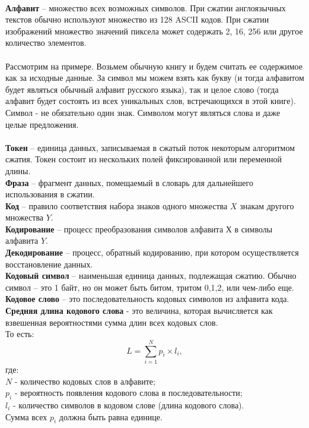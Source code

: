 \\\textbf{Алфавит} -- множество всех возможных символов. При сжатии англоязычных текстов обычно используют множество из 128 ASCII кодов. При сжатии изображений множество значений пиксела может содержать 2, 16, 256 или другое количество элементов.
\\
\\Рассмотрим на примере. Возьмем обычную книгу и будем считать ее содержимое как за исходные данные. За символ мы можем взять как букву (и тогда алфавитом будет являться обычный алфавит русского языка), так и целое слово (тогда алфавит будет состоять из всех уникальных слов, встречающихся в этой книге). Символ - не обязательно один знак. Символом могут являться слова и даже целые предложения.\\
\\\textbf{Токен} -- единица данных, записываемая в сжатый поток некоторым алгоритмом сжатия. Токен состоит из нескольких полей фиксированной или переменной длины.
\\\textbf{Фраза} -- фрагмент данных, помещаемый в словарь для дальнейшего использования в сжатии.
\\\textbf{Код} -- правило соответствия набора знаков одного множества $X$ знакам другого множества $Y$.
\\\textbf{Кодирование} -- процесс преобразования символов алфавита $Х$ в символы алфавита $Y$.
\\\textbf{Декодирование} -- процесс, обратный кодированию, при котором осуществляется восстановление данных.
\\\textbf{Кодовый символ} -- наименьшая единица данных, подлежащая сжатию. Обычно символ – это 1 байт, но он может быть битом, тритом {0,1,2}, или чем-либо еще.
\\\textbf{Кодовое слово} -- это последовательность кодовых символов из алфавита кода.
\\\textbf{Средняя длина кодового слова} - это величина, которая вычисляется как взвешенная вероятностями сумма длин всех кодовых слов.
\\То есть:
$$ L = \sum_{i=1}^{N}p_{i}\times l_{i},$$ где: 
\\$N$ - количество кодовых слов в алфавите;
\\$p_{i}$ - вероятность появления кодового слова в последовательности;
\\$l_{i}$ - количество символов в кодовом слове (длина кодового слова).
\\Сумма всех $p_{i}$ должна быть равна единице.
\\
